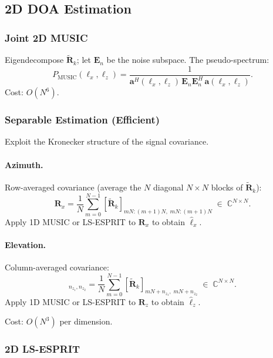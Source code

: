 \documentclass[11pt,a4paper]{article}
\newcommand{\C}{\mathbb{C}}
\begin{document}
\subsection{2D DOA Estimation}
\label{sec:doa}

\subsubsection{Joint 2D MUSIC}

Eigendecompose $\tilde{\mathbf{R}}_k$; let $\mathbf{E}_n$ be the
noise subspace.  The pseudo-spectrum:
\begin{equation}
  P_{\mathrm{MUSIC}}(\ell_x,\ell_z)
  =\frac{1}{\mathbf{a}^H(\ell_x,\ell_z)\,
  \mathbf{E}_n\mathbf{E}_n^H\,\mathbf{a}(\ell_x,\ell_z)}.
  \label{eq:music2d}
\end{equation}
Cost: $O(N^6)$.

\subsubsection{Separable Estimation (Efficient)}
\label{sec:sep_doa}

Exploit the Kronecker structure of the signal covariance.

\paragraph{Azimuth.}
Row-averaged covariance (average the $N$ diagonal $N\times N$
blocks of $\tilde{\mathbf{R}}_k$):
\begin{equation}
  \mathbf{R}_x=\frac{1}{N}\sum_{m=0}^{N-1}
  [\tilde{\mathbf{R}}_k]_{mN:(m{+}1)N,\;mN:(m{+}1)N}
  \;\in\;\C^{N\times N}.
  \label{eq:Rx}
\end{equation}
Apply 1D MUSIC or LS-ESPRIT to $\mathbf{R}_x$ to obtain
$\hat{\ell}_x$.

\paragraph{Elevation.}
Column-averaged covariance:
\begin{equation}
  [\mathbf{R}_z]_{n_{z_1},n_{z_2}}
  =\frac{1}{N}\sum_{m=0}^{N-1}
  [\tilde{\mathbf{R}}_k]_{mN+n_{z_1},\;mN+n_{z_2}}
  \;\in\;\C^{N\times N}.
  \label{eq:Rz}
\end{equation}
Apply 1D MUSIC or LS-ESPRIT to $\mathbf{R}_z$ to obtain
$\hat{\ell}_z$.

Cost: $O(N^3)$ per dimension.

\subsubsection{2D LS-ESPRIT}
\end{document}

